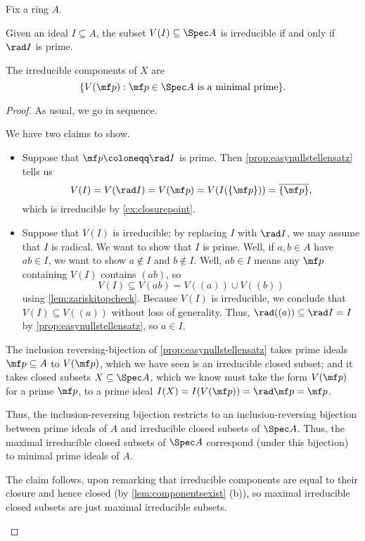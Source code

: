 \documentclass[../notes.tex]{subfiles}
\begin{document}
\begin{lemma} \label{lem:affineirredcomps}
	Fix a ring $A$.
	\begin{listalph}
		\item Given an ideal $I\subseteq A$, the subset $V(I)\subseteq\Spec A$ is irreducible if and only if $\rad I$ is prime.
		\item The irreducible components of $X$ are
		\[\{V(\mf p):\mf p\in\Spec A\text{ is a minimal prime}\}.\]
	\end{listalph}
\end{lemma}
\begin{proof}
	As usual, we go in sequence.
	\begin{listalph}
		\item We have two claims to show.
		\begin{itemize}
			\item Suppose that $\mf p\coloneqq\rad I$ is prime. Then \autoref{prop:easynullstellensatz} tells us
			\[V(I)=V(\rad I)=V(\mf p)=V(I(\{\mf p\}))=\overline{\{\mf p\}},\]
			which is irreducible by \autoref{ex:closurepoint}.
			\item Suppose that $V(I)$ is irreducible; by replacing $I$ with $\rad I$, we may assume that $I$ is radical. We want to show that $I$ is prime. Well, if $a,b\in A$ have $ab\in I$, we want to show $a\notin I$ and $b\notin I$. Well, $ab\in I$ means any $\mf p$ containing $V(I)$ contains $(ab)$, so
			\[V(I)\subseteq V(ab)=V((a))\cup V((b))\]
			using \autoref{lem:zariskitopcheck}. Because $V(I)$ is irreducible, we conclude that $V(I)\subseteq V((a))$ without loss of generality. Thus, $\rad((a))\subseteq\rad I=I$ by \autoref{prop:easynullstellensatz}, so $a\in I$.
		\end{itemize}
		\item The inclusion reversing-bijection of \autoref{prop:easynullstellensatz} takes prime ideals $\mf p\subseteq A$ to $V(\mf p)$, which we have seen is an irreducible closed subset; and it takes closed subsets $X\subseteq\Spec A$, which we know must take the form $V(\mf p)$ for a prime $\mf p$, to a prime ideal $I(X)=I(V(\mf p))=\rad\mf p=\mf p$.

		Thus, the inclusion-reversing bijection restricts to an inclusion-reversing bijection between prime ideals of $A$ and irreducible closed subsets of $\Spec A$. Thus, the maximal irreducible closed subsets of $\Spec A$ correspond (under this bijection) to minimal prime ideals of $A$.
		
		The claim follows, upon remarking that irreducible components are equal to their closure and hence closed (by \autoref{lem:componentsexist} (b)), so maximal irreducible closed subsets are just maximal irreducible subsets.
		\qedhere
	\end{listalph}
\end{proof}
\end{document}
